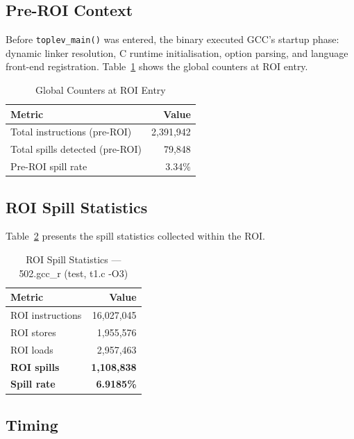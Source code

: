 \documentclass[conference]{IEEEtran}
\begin{document}
\subsection{Pre-ROI Context}

Before \texttt{toplev\_main()} was entered, the binary executed
GCC's startup phase: dynamic linker resolution, C runtime
initialisation, option parsing, and language front-end registration.
Table~\ref{tab:preroi} shows the global counters at ROI entry.

\begin{table}[H]
\centering
\caption{Global Counters at ROI Entry}
\label{tab:preroi}
\begin{tabular}{lr}
\toprule
\textbf{Metric} & \textbf{Value} \\
\midrule
Total instructions (pre-ROI) & 2,391,942 \\
Total spills detected (pre-ROI) & 79,848 \\
Pre-ROI spill rate & 3.34\% \\
\bottomrule
\end{tabular}
\end{table}

\subsection{ROI Spill Statistics}

Table~\ref{tab:roi} presents the spill statistics collected within
the ROI.

\begin{table}[H]
\centering
\caption{ROI Spill Statistics --- 502.gcc\_r (test, t1.c -O3)}
\label{tab:roi}
\begin{tabular}{lr}
\toprule
\textbf{Metric} & \textbf{Value} \\
\midrule
ROI instructions         & 16,027,045 \\
ROI stores               &  1,955,576 \\
ROI loads                &  2,957,463 \\
\midrule
\textbf{ROI spills}      & \textbf{1,108,838} \\
\textbf{Spill rate}      & \textbf{6.9185\%} \\
\bottomrule
\end{tabular}
\end{table}

\subsection{Timing}
\end{document}
